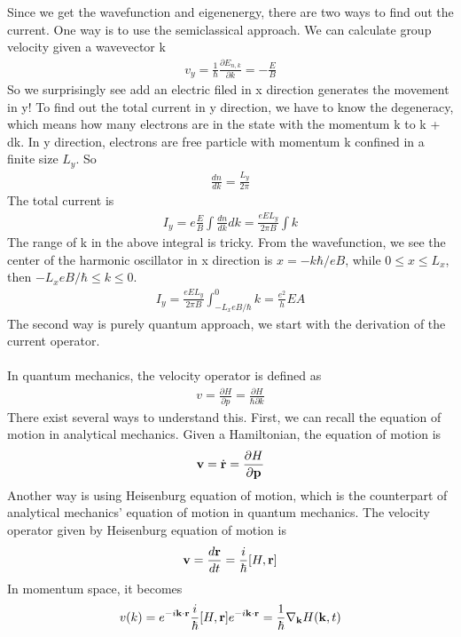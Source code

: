 \documentclass[a4paper]{article}
\begin{document}
Since we get the wavefunction and eigenenergy, there are two ways to find out the current. One way is to use the semiclassical approach. We can calculate group velocity given a wavevector k
\begin{align*}
	v_y = \frac{1}{\hbar} \frac{\partial E_{n,k}}{\partial k} = -\frac{E}{B}
\end{align*}
So we surprisingly see add an electric filed in x direction generates the movement in y!
To find out the total current in y direction, we have to know the degeneracy, which means how many electrons are in the state with the momentum k to k + dk. In y direction, electrons are free particle with momentum k confined in a finite size $L_y$. So
\begin{align*}
	\frac{dn}{dk} = \frac{L_y}{2 \pi}
\end{align*}
The total current is
\begin{align*}
	I_y = e \frac{E}{B} \int \frac{dn}{dk}dk = \frac{eEL_y}{2\pi B} \int k
\end{align*}
The range of k in the above integral is tricky. From the wavefunction, we see the center of the harmonic oscillator in x direction is $x = -k\hbar/eB$, while $ 0 \leq x \leq L_x$, then $-L_x eB/\hbar  \leq k \leq 0$.
\begin{align*}
	I_y = \frac{eEL_y}{2\pi B} \int_{-L_xeB/\hbar}^0 k = \frac{e^2}{h}EA
\end{align*}
The second way is purely quantum approach, we start with the derivation of the current operator.\\
\\
In quantum mechanics, the velocity operator is defined as
\begin{align*}
	v = \frac{\partial H}{\partial p} = \frac{\partial H}{ \hbar \partial k}
\end{align*}
There exist several ways to understand this. First, we can recall the equation of motion in analytical mechanics. Given a Hamiltonian, the equation of motion is
\begin{align*}
	{\bf v} = \dot{{\bf r}} = \frac{\partial H}{\partial {\bf p}}
\end{align*}
Another way is using Heisenburg equation of motion, which is the counterpart of analytical mechanics' equation of motion in quantum mechanics. The velocity operator given by Heisenburg equation of motion is
\begin{align*}
	{\bf v} = \frac{d{\bf r}}{dt} = \frac{i}{\hbar}[H, {\bf r}]
\end{align*}
In momentum space, it becomes
\begin{align*}
	v(k) = e^{-i{\bf k} \cdot {\bf r}} \frac{i}{\hbar}[H, {\bf r}] e^{-i{\bf k} \cdot {\bf r}} = \frac{1}{\hbar} \nabla_{\bf k} H({\bf k},t)
\end{align*}
\end{document}
